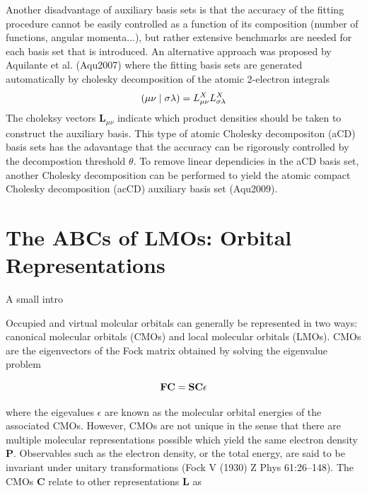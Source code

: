 Another disadvantage of auxiliary basis sets is that the accuracy of the fitting procedure cannot be easily controlled as a function of its composition (number of functions, angular momenta...), but rather extensive benchmarks are needed for each basis set that is introduced. An alternative approach was proposed by Aquilante et al. (Aqu2007) where the fitting basis sets are generated automatically by cholesky decomposition of the atomic 2-electron integrals
\begin{equation}
\left( \mu\nu \mid \sigma\lambda \right) = L^X_{\mu\nu} L^X_{\sigma\lambda}
\end{equation}
\noindent The choleksy vectors $\mathbf{L}_{\mu\nu}$ indicate which product densities should be taken to construct the auxiliary basis. This type of atomic Cholesky decompositon (aCD) basis sets has the adavantage that the accuracy can be rigorously controlled by the decompostion threshold $\theta$. To remove linear dependicies in the aCD basis set, another Cholesky decomposition can be performed to yield the atomic compact Cholesky decomposition (acCD) auxiliary basis set (Aqu2009).


\section{The ABCs of LMOs: Orbital Representations}

A small intro


Occupied and virtual molcular orbitals can generally be represented in two ways: canonical molecular orbitals (CMOs) and local molecular orbitals (LMOs). CMOs are the eigenvectors of the Fock matrix obtained by solving the eigenvalue problem

\begin{equation}
\mathbf{F}\mathbf{C} = \mathbf{S}\mathbf{C} \epsilon
\end{equation}

where the eigevalues $\epsilon$ are known as the molecular orbital energies of the associated CMOs. However, CMOs are not unique in the sense that there are multiple molecular representations possible which yield the same electron density $\mathbf{P}$. Observables such as the electron density, or the total energy, are said to be invariant under unitary transformations (Fock V (1930) Z Phys 61:26–148). The CMOs $\mathbf{C}$ relate to other representations $\mathbf{L}$ as

